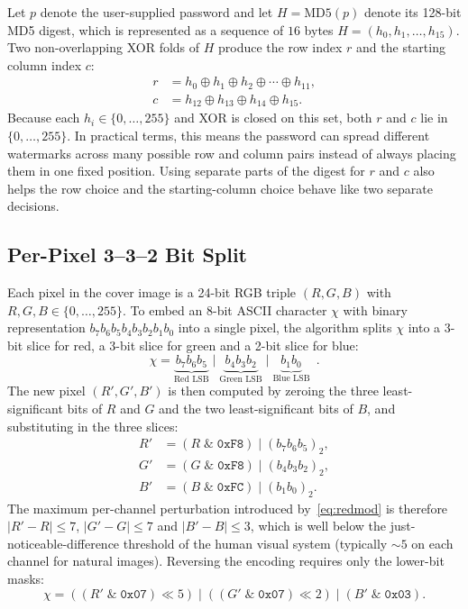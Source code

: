 Let $p$ denote the user-supplied password and let $H = \mathrm{MD5}(p)$ denote its 128-bit MD5 digest, which is represented as a sequence of $16$ bytes $H = (h_0, h_1, \ldots, h_{15})$. Two non-overlapping XOR folds of $H$ produce the row index $r$ and the starting column index $c$:
\begin{align}
    r &= h_0 \oplus h_1 \oplus h_2 \oplus \cdots \oplus h_{11}, \label{eq:row}\\
    c &= h_{12} \oplus h_{13} \oplus h_{14} \oplus h_{15}. \label{eq:col}
\end{align}
Because each $h_i \in \{0, \ldots, 255\}$ and XOR is closed on this set, both $r$ and $c$ lie in $\{0, \ldots, 255\}$. In practical terms, this means the password can spread different watermarks across many possible row and column pairs instead of always placing them in one fixed position. Using separate parts of the digest for $r$ and $c$ also helps the row choice and the starting-column choice behave like two separate decisions.

\subsection{Per-Pixel 3--3--2 Bit Split}

Each pixel in the cover image is a 24-bit RGB triple $(R, G, B)$ with $R, G, B \in \{0, \ldots, 255\}$. To embed an 8-bit ASCII character $\chi$ with binary representation $b_7 b_6 b_5 b_4 b_3 b_2 b_1 b_0$ into a single pixel, the algorithm splits $\chi$ into a 3-bit slice for red, a 3-bit slice for green and a 2-bit slice for blue:
\begin{equation}
    \chi = \underbrace{b_7 b_6 b_5}_{\text{Red LSB}} \mid \underbrace{b_4 b_3 b_2}_{\text{Green LSB}} \mid \underbrace{b_1 b_0}_{\text{Blue LSB}} \enspace .
\end{equation}
The new pixel $(R', G', B')$ is then computed by zeroing the three least-significant bits of $R$ and $G$ and the two least-significant bits of $B$, and substituting in the three slices:
\begin{align}
    R' &= (R \;\&\; \mathtt{0xF8}) \mid (b_7 b_6 b_5)_2, \label{eq:redmod}\\
    G' &= (G \;\&\; \mathtt{0xF8}) \mid (b_4 b_3 b_2)_2, \\
    B' &= (B \;\&\; \mathtt{0xFC}) \mid (b_1 b_0)_2.
\end{align}
The maximum per-channel perturbation introduced by~\eqref{eq:redmod} is therefore $|R' - R| \le 7$, $|G' - G| \le 7$ and $|B' - B| \le 3$, which is well below the just-noticeable-difference threshold of the human visual system (typically $\sim 5$ on each channel for natural images). Reversing the encoding requires only the lower-bit masks:
\begin{equation}
    \chi = ((R' \;\&\; \mathtt{0x07}) \ll 5) \mid ((G' \;\&\; \mathtt{0x07}) \ll 2) \mid (B' \;\&\; \mathtt{0x03}).
\end{equation}

